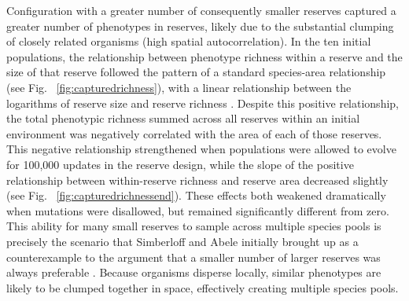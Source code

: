 \documentclass[letterpaper]{article}
\begin{document}
    Configuration with a greater number of consequently smaller reserves captured a greater number of phenotypes in reserves, likely due to the substantial clumping of closely related organisms (high spatial autocorrelation). In the ten initial populations, the relationship between phenotype richness within a reserve and the size of that reserve followed the pattern of a standard species-area relationship (see Fig. ~\ref{fig:capturedrichness}), with a linear relationship between the logarithms of reserve size and reserve richness \citep{connor_statistics_1979}. Despite this positive relationship, the total phenotypic richness summed across all reserves within an initial environment was negatively correlated with the area of each of those reserves. This negative relationship strengthened when populations were allowed to evolve for 100,000 updates in the reserve design, while the slope of the positive relationship between within-reserve richness and reserve area decreased slightly (see Fig. ~\ref{fig:capturedrichnessend}). These effects both weakened dramatically when mutations were disallowed, but remained significantly different from zero. This ability for many small reserves to sample across multiple species pools is precisely the scenario that Simberloff and Abele initially brought up as a counterexample to the argument that a smaller number of larger reserves was always preferable \citep{simberloff_island_1976}. Because organisms disperse locally, similar phenotypes are likely to be clumped together in space, effectively creating multiple species pools. 
%
%
%
%
%
%
%
%
%
%
\end{document}
